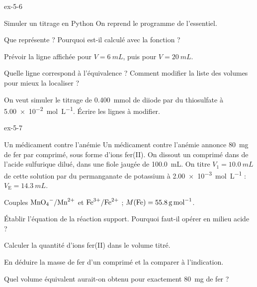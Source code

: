 \begin{blocLivre}{ex-5-6}
\begin{exercice}[2]{Simuler un titrage en Python}
On reprend le programme de l'essentiel.
\begin{questions}
\item {}Que représente  ? Pourquoi est-il calculé avec la fonction  ?
\item Prévoir la ligne affichée pour $V=\qty{6}{mL}$, puis pour $V=\qty{20}{mL}$.
\item Quelle ligne correspond à l'équivalence ? Comment modifier la liste des volumes pour mieux la localiser ?
\item On veut simuler le titrage de \qty{0,400}{mmol} de diiode par du thiosulfate à \qty{5,00e-2}{mol.L^{-1}}. Écrire les lignes à modifier.
\end{questions}
\end{exercice}
\end{blocLivre}
\begin{blocLivre}{ex-5-7}
\begin{exercice}[2]{Un médicament contre l'anémie}
Un médicament contre l'anémie annonce \qty{80}{mg} de fer par comprimé, sous forme d'ions fer(II). On dissout un comprimé dans
de l'acide sulfurique dilué, dans une fiole jaugée de \qty{100,0}{mL}. On titre $V_1=\qty{10,0}{mL}$ de cette solution par du
permanganate de potassium à \qty{2,00e-3}{mol.L^{-1}} : $V_\mathrm{E}=\qty{14,3}{mL}$.
\begin{donnees}
Couples $\ce{MnO4-}/\ce{Mn^{2+}}$ et $\ce{Fe^{3+}}/\ce{Fe^{2+}}$ ; $M(\ce{Fe})=\qty{55,8}{g.mol^{-1}}$.
\end{donnees}
\begin{questions}
\item Établir l'équation de la réaction support. Pourquoi faut-il opérer en milieu acide ?
\item Calculer la quantité d'ions fer(II) dans le volume titré.
\item En déduire la masse de fer d'un comprimé et la comparer à l'indication.
\item Quel volume équivalent aurait-on obtenu pour exactement \qty{80}{mg} de fer ?
\end{questions}
\end{exercice}
\end{blocLivre}
